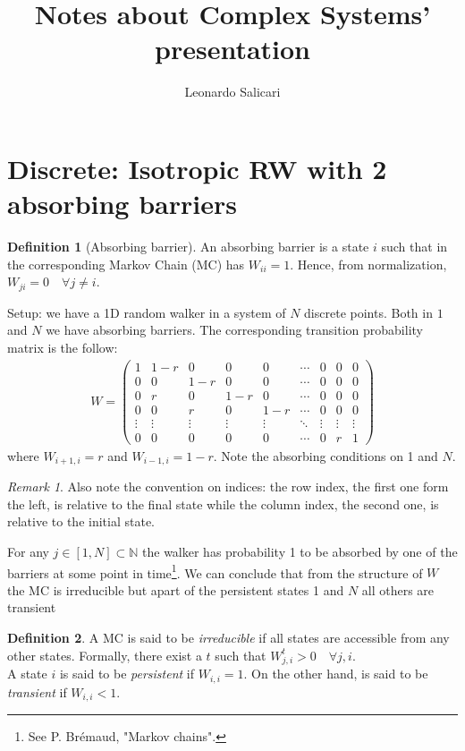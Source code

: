 \documentclass[4apaper,11pt,fleqn]{article}
\title{Notes about Complex Systems' presentation}
\author{Leonardo Salicari}
\theoremstyle{remark}
\newtheorem*{rem}{Remark}
\theoremstyle{definition}
\newtheorem*{dfn}{Definition}
\begin{document}
\maketitle
\tableofcontents


\section{Discrete: Isotropic RW with 2 absorbing barriers}
\begin{dfn}[Absorbing barrier]
  An absorbing barrier is a state $i$ such that in the corresponding Markov Chain (MC) has $W_{ii} = 1$.
  Hence, from normalization, $W_{ji} = 0 \quad \forall  j \neq i$.
\end{dfn}
Setup: we have a 1D random walker in a system of $N$ discrete points. Both in $1$ and $N$ we have absorbing barriers. The corresponding transition probability matrix is the follow:
\begin{align*}
  W = \left( \begin{array}{ccccccccc}{1} & {1-r} & {0} & {0} & {0} & {\cdots} & {0} & {0} & {0} \\ {0} & {0} & {1-r} & {0} & {0} & {\cdots} & {0} & {0} & {0} \\ {0} & {r} & {0} & {1-r} & {0} & {\cdots} & {0} & {0} & {0} \\ {0} & {0} & {r} & {0} & {1-r} & {\cdots} & {0} & {0} & {0} \\ {\vdots} & {\vdots} & {\vdots} & {\vdots} & {\vdots} & {\ddots} & {\vdots} & {\vdots} & {\vdots} \\ {0} & {0} & {0} & {0} & {0} & {\cdots} & {0} & {r} & {1} \end{array} \right)
\end{align*}
where $ W_{i+1,i} = r $ and $W_{i-1,i} = 1-r$. Note the absorbing conditions on 1 and $N$.
\begin{rem}
  Also note the convention on indices: the row index, the first one form the left, is relative to the final state while the column index, the second one, is relative to the initial state.
\end{rem}
For any $j \in [1,N] \subset \mathbb{N}$ the walker has probability 1 to be absorbed by one of the barriers at some point in time\footnote{See P. Brémaud, "Markov chains".}. We can conclude that from the structure of $W$ the MC is irreducible but apart of the persistent states 1 and $N$ all others are transient
\begin{dfn}
  A MC is said to be \emph{irreducible} if all states are accessible from any other states. Formally, there exist a $t$ such that $W^t_{j,i} > 0 \quad \forall j, i$.\\
  A state $i$ is said to be \emph{persistent} if $W_{i,i}=1$. On the other hand, is said to be \emph{transient} if $W_{i,i}<1$.
\end{dfn}
\end{document}
